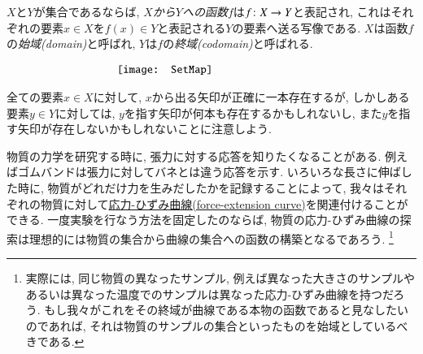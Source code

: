 $X$と$Y$が集合であるならば, \emph{$X$から$Y$への函数$f$}は$f\colon X\rightarrow Y$と表記され, これはそれぞれの要素$x\in X$を$f(x)\in Y$と表記される$Y$の要素へ送る写像である. $X$は函数$f$の\emph{始域(domain)}と呼ばれ, $Y$は$f$の\emph{終域(codomain)}と呼ばれる.

\begin{align}\label{dia:setmap}
\parbox{2.3in}{\texttt{[image: SetMap]}}
\end{align}


全ての要素$x\in X$に対して, $x$から出る矢印が正確に一本存在するが, しかしある要素$y\in Y$に対しては, $y$を指す矢印が何本も存在するかもしれないし, また$y$を指す矢印が存在しないかもしれないことに注意しよう.

\begin{application}\label{app:force-extension}


物質の力学を研究する時に, 張力に対する応答を知りたくなることがある. 例えばゴムバンドは張力に対してバネとは違う応答を示す. いろいろな長さに伸ばした時に, 物質がどれだけ力を生みだしたかを記録することによって, 我々はそれぞれの物質に対して\href{http://en.wikipedia.org/wiki/Stress–strain_curve}{応力-ひずみ曲線(force-extension curve)}を関連付けることができる. 一度実験を行なう方法を固定したのならば, 物質の応力-ひずみ曲線の探索は理想的には物質の集合から曲線の集合への函数の構築となるであろう.
\footnote{実際には, 同じ物質の異なったサンプル, 例えば異なった大きさのサンプルやあるいは異なった温度でのサンプルは異なった応力-ひずみ曲線を持つだろう. もし我々がこれをその終域が曲線である本物の函数であると見なしたいのであれば, それは物質のサンプルの集合といったものを始域としているべきである.}

\end{application}

